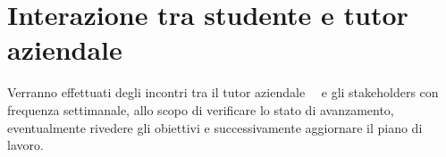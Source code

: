 \section*{Interazione tra studente e tutor aziendale}
Verranno effettuati degli incontri tra il tutor aziendale \nomeTutorAziendale\ \cognomeTutorAziendale\ e gli stakeholders con frequenza settimanale, allo scopo di verificare lo stato di avanzamento, eventualmente rivedere gli obiettivi e successivamente aggiornare il piano di lavoro.